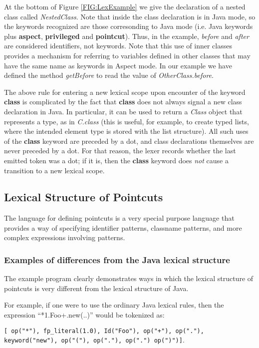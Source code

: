 At the bottom of Figure \ref{FIG:LexExample} we give the declaration of
a nested class called {\em NestedClass}.   Note that inside the class
declaration is in {\sc Java} mode,  so the keywords recognized are those
corresonding to {\sc Java} mode (i.e. Java keywords plus {\bf aspect},
{\bf privileged} and {\bf pointcut}).    Thus, in the example,  
{\em before} and {\em after} are considered identifiers, not keywords.   
Note that this use of
inner classes provides a mechanism for referring to variables defined
in other classes that may have the same name as keywords in 
{\sc Aspect} mode.  In our example we have defined the method
{\em getBefore} to read the value of {\em OtherClass.before}.

The above rule for entering a new lexical scope upon encounter of
the keyword {\bf class} is complicated by the fact that {\bf class}
does not always signal a new class declaration in Java. In particular,
it can be used to return a {\em Class} object that represents a type,
as in {\em C.class} (this is useful, for example, to create typed lists, 
where the intended element type is stored with the list structure).
All such uses of the {\bf class} keyword are preceded by a
dot, and class declarations themselves are never preceded by a dot. 
For that reason, the lexer records whether the last emitted token
was a dot; if it is, then the {\bf class} keyword does {\em not}
cause a transition to a new lexical scope.

\subsection{Lexical Structure of Pointcuts}

The language for defining pointcuts is a very special purpose
language that provides a way of specifying identifier patterns,
classname patterns, and more complex expressions involving
patterns.     

\subsubsection{Examples of differences from the Java lexical structure}
The example program clearly demonstrates ways in which the
lexical structure of pointcuts is very different from the 
lexical structure of Java.

For example, if one were to use the ordinary Java
lexical rules, then the expression ``*1.Foo+.new(..)'' 
would be tokenized as:

{\tt[ op("*"), fp\_literal(1.0), Id("Foo"), op("+"), op("."),  
keyword("new"), op("("), op("."), op(".") op(")")]}.  

